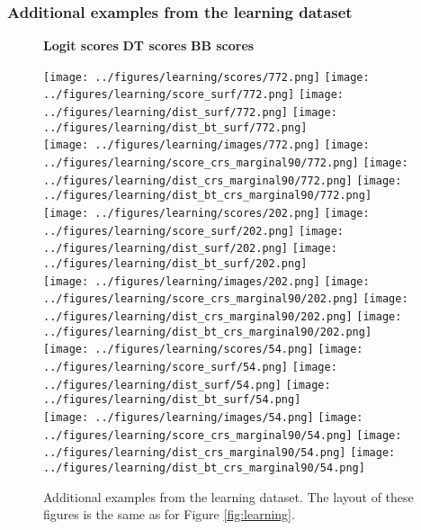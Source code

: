 \subsubsection{Additional examples from the learning dataset}
\begin{figure}[h!]
\hspace{4.3cm} {\fontsize{11pt}{13pt}\selectfont \textbf{Logit scores}} \hspace{1.2cm} 
{\fontsize{11pt}{13pt}\selectfont \textbf{DT scores}} \hspace{1.3cm} 
{\fontsize{11pt}{13pt}\selectfont \textbf{BB scores}}
	\begin{center}
		\texttt{[image: ../figures/learning/scores/772.png]}
		\texttt{[image: ../figures/learning/score\_surf/772.png]}	\texttt{[image: ../figures/learning/dist\_surf/772.png]}
		\texttt{[image: ../figures/learning/dist\_bt\_surf/772.png]}\\
		\texttt{[image: ../figures/learning/images/772.png]}
		\texttt{[image: ../figures/learning/score\_crs\_marginal90/772.png]}
		\texttt{[image: ../figures/learning/dist\_crs\_marginal90/772.png]}
		\texttt{[image: ../figures/learning/dist\_bt\_crs\_marginal90/772.png]}\\
		\vspace{0.5cm}
		\texttt{[image: ../figures/learning/scores/202.png]}
		\texttt{[image: ../figures/learning/score\_surf/202.png]}	\texttt{[image: ../figures/learning/dist\_surf/202.png]}
		\texttt{[image: ../figures/learning/dist\_bt\_surf/202.png]}\\
		\texttt{[image: ../figures/learning/images/202.png]}
		\texttt{[image: ../figures/learning/score\_crs\_marginal90/202.png]}
		\texttt{[image: ../figures/learning/dist\_crs\_marginal90/202.png]}
		\texttt{[image: ../figures/learning/dist\_bt\_crs\_marginal90/202.png]}\\
			\vspace{0.5cm}
		\texttt{[image: ../figures/learning/scores/54.png]}
		\texttt{[image: ../figures/learning/score\_surf/54.png]}	\texttt{[image: ../figures/learning/dist\_surf/54.png]}
		\texttt{[image: ../figures/learning/dist\_bt\_surf/54.png]}\\
		\texttt{[image: ../figures/learning/images/54.png]}
		\texttt{[image: ../figures/learning/score\_crs\_marginal90/54.png]}
		\texttt{[image: ../figures/learning/dist\_crs\_marginal90/54.png]}
		\texttt{[image: ../figures/learning/dist\_bt\_crs\_marginal90/54.png]}
	\end{center}
	\caption{Additional examples from the learning dataset. The layout of these figures is the same as for Figure \ref{fig:learning}.}
	\label{fig:learning2}
\end{figure}

